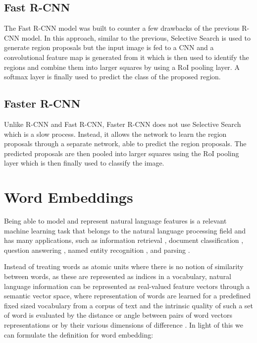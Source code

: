 \subsection{Fast R-CNN}

The Fast R-CNN \cite{girshick2015fast} model was built to counter a
few drawbacks of the previous R-CNN model. In this approach, similar
to the previous, Selective Search is used to generate region proposals
but the input image is fed to a CNN and a convolutional feature map is
generated from it which is then used to identify the regions and
combine them into larger squares by using a RoI pooling layer. A
softmax layer is finally used to predict the class of the proposed
region.

\subsection{Faster R-CNN}
\label{subsec:faster-rcnn}

Unlike R-CNN and Fast R-CNN, Faster R-CNN \cite{ren2015faster} does
not use Selective Search which is a slow process. Instead, it allows
the network to learn the region proposals through a separate network,
able to predict the region proposals. The predicted proposals are then
pooled into larger squares using the RoI pooling layer which is then
finally used to classify the image.

\section{Word Embeddings}
\label{sec:word-embeddings}

Being able to model and represent natural language features is a
relevant machine learning task that belongs to the natural language
processing field and has many applications, such as information
retrieval \cite{sanderson2010christopher}, document classification
\cite{sebastiani2002machine}, question answering
\cite{tellex2003quantitative}, named entity recognition
\cite{turian2010word}, and parsing \cite{socher2013parsing}.

Instead of treating words as atomic units where there is no notion of
similarity between words, as these are represented as indices in a
vocabulary, natural language information can be represented as
real-valued feature vectors through a semantic vector space, where
representation of words are learned for a predefined fixed sized
vocabulary from a corpus of text and the intrinsic quality of such a
set of word is evaluated by the distance or angle between pairs of
word vectors representations or by their various dimensions of
difference \cite{mikolov2013linguistic}. In light of this we can
formulate the definition for word embedding: 


